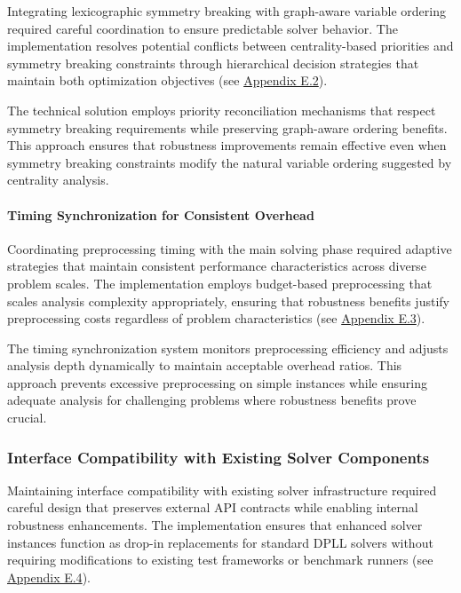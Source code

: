 Integrating lexicographic symmetry breaking with graph-aware variable ordering required careful coordination to ensure predictable solver behavior. The implementation resolves potential conflicts between centrality-based priorities and symmetry breaking constraints through hierarchical decision strategies that maintain both optimization objectives (see \hyperref[appendix:symmetry-integration]{Appendix E.2}).

The technical solution employs priority reconciliation mechanisms that respect symmetry breaking requirements while preserving graph-aware ordering benefits. This approach ensures that robustness improvements remain effective even when symmetry breaking constraints modify the natural variable ordering suggested by centrality analysis.

\paragraph{Timing Synchronization for Consistent Overhead}

Coordinating preprocessing timing with the main solving phase required adaptive strategies that maintain consistent performance characteristics across diverse problem scales. The implementation employs budget-based preprocessing that scales analysis complexity appropriately, ensuring that robustness benefits justify preprocessing costs regardless of problem characteristics (see \hyperref[appendix:timing-coordination]{Appendix E.3}).

The timing synchronization system monitors preprocessing efficiency and adjusts analysis depth dynamically to maintain acceptable overhead ratios. This approach prevents excessive preprocessing on simple instances while ensuring adequate analysis for challenging problems where robustness benefits prove crucial.

\subsubsection{Interface Compatibility with Existing Solver Components}

Maintaining interface compatibility with existing solver infrastructure required careful design that preserves external API contracts while enabling internal robustness enhancements. The implementation ensures that enhanced solver instances function as drop-in replacements for standard DPLL solvers without requiring modifications to existing test frameworks or benchmark runners (see \hyperref[appendix:interface-compatibility]{Appendix E.4}).

